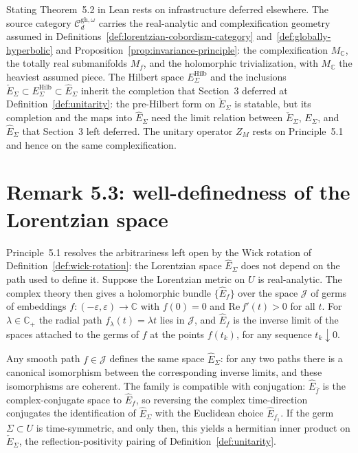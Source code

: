 Stating Theorem~5.2 in Lean rests on infrastructure deferred elsewhere. The source
category $\mathcal C_d^{\mathrm{gh},\omega}$ carries the real-analytic and
complexification geometry assumed in
Definitions~\ref{def:lorentzian-cobordism-category} and~\ref{def:globally-hyperbolic}
and Proposition~\ref{prop:invariance-principle}: the complexification $M_{\mathbb C}$,
the totally real submanifolds $M_f$, and the holomorphic trivialization, with
$M_{\mathbb C}$ the heaviest assumed piece. The Hilbert space
$E_{\Sigma}^{\mathrm{Hilb}}$ and the inclusions
$\check E_{\Sigma} \subset E_{\Sigma}^{\mathrm{Hilb}} \subset \hat E_{\Sigma}$ inherit
the completion that Section~3 deferred at Definition~\ref{def:unitarity}: the
pre-Hilbert form on $\check E_{\Sigma}$ is statable, but its completion and the maps
into $\hat E_{\Sigma}$ need the limit relation between $\check E_{\Sigma}$,
$E_{\Sigma}$, and $\hat E_{\Sigma}$ that Section~3 left deferred. The unitary operator
$Z_M$ rests on Principle~5.1 and hence on the same complexification.

\section{Remark 5.3: well-definedness of the Lorentzian space}

Principle~5.1 resolves the arbitrariness left open by the Wick rotation of
Definition~\ref{def:wick-rotation}: the Lorentzian space $\hat E_{\Sigma}$ does not
depend on the path used to define it. Suppose the Lorentzian metric on $U$ is
real-analytic. The complex theory then gives a holomorphic bundle $\{\hat E_f\}$ over
the space $\mathcal J$ of germs of embeddings
$f \colon (-\varepsilon, \varepsilon) \to \mathbb C$ with $f(0) = 0$ and
$\mathrm{Re}\, f'(t) > 0$ for all $t$. For $\lambda \in \mathbb C_+$ the radial path
$f_{\lambda}(t) = \lambda t$ lies in $\mathcal J$, and $\hat E_f$ is the inverse limit
of the spaces attached to the germs of $f$ at the points $f(t_k)$, for any sequence
$t_k \downarrow 0$.

\begin{proposition}
  \label{prop:lorentzian-E-welldefined}
  \notready
  Any smooth path $f \in \mathcal J$ defines the same space $\hat E_{\Sigma}$: for any
  two paths there is a canonical isomorphism between the corresponding inverse limits,
  and these isomorphisms are coherent. The family is compatible with conjugation:
  $\hat E_{\bar f}$ is the complex-conjugate space to $\hat E_f$, so reversing the
  complex time-direction conjugates the identification of $\hat E_{\Sigma}$ with the
  Euclidean choice $\hat E_{f_1}$. If the germ $\Sigma \subset U$ is time-symmetric,
  and only then, this yields a hermitian inner product on $\check E_{\Sigma}$, the
  reflection-positivity pairing of Definition~\ref{def:unitarity}.
\end{proposition}

